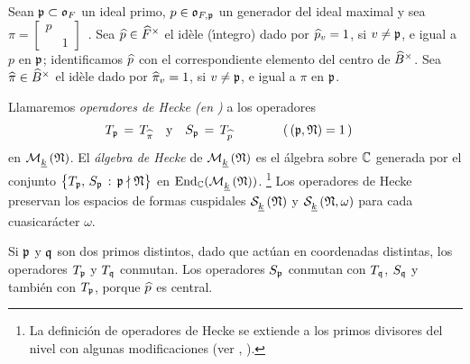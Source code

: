 Sean $\frak{p}\subset\oka{F}$ un ideal primo, $p\in\oka{F,\frak{p}}$ un
generador del ideal maximal y sea
\begin{math}
	\pi=\begin{bmatrix} p & \\ & 1 \end{bmatrix}
\end{math}~.
Sea $\hhat{p}\in\Idfin{F}$ el id\`{e}le (\'{\i}ntegro) dado por
$\hhat{p}_{v}=1$, si $v\not=\frak{p}$, e igual a $p$ en $\frak{p}$;
identificamos $\hhat{p}$ con el correspondiente elemento del centro de
$\Idfin{B}$. Sea $\hhat{\pi}\in\Idfin{B}$ el id\`{e}le dado por
$\hhat{\pi}_{v}=1$, si $v\not=\frak{p}$, e igual a $\pi$ en $\frak{p}$.

\begin{defOperadoresDeHeckeMatrices}\label{def:operadoresdeheckematrices}
	Llamaremos \emph{operadores de Hecke (en )} a los operadores
	\begin{align*}
		T_{\frak{p}}\,=\,T_{\hhat{\pi}} & \quad\text{y}\quad
			S_{\frak{p}}\,=\,T_{\hhat{p}}
		\qquad\qquad (\,(\frak{p},\frak{N})=1\,)
	\end{align*}
	en $\modularH{k}{\frak{N}}$.
	El \emph{\'{a}lgebra de Hecke} de $\modularH{k}{\frak{N}}$ es el
	\'{a}lgebra sobre $\bb{C}$ generada por el conjunto
	\begin{math}
		\big\{T_{\frak{p}},\,S_{\frak{p}}
			\,:\,\frak{p}\nmid\frak{N}\big\}
	\end{math}
	en $\Endo[\bb{C}](\modularH{k}{\frak{N}})$.%
	\footnote{
		La definici\'{o}n de operadores de Hecke se extiende a los
		primos divisores del nivel con algunas modificaciones (ver
		\cite{ShemanskeWalling}, \cite{MiyakeOnAutomorphicFormsOnGL}).
	}
	Los operadores de Hecke preservan los espacios de formas cuspidales
	$\spitzH{k}{\frak{N}}$ y $\spitzH{k}{\frak{N},\omega}$ para cada
	cuasicar\'{a}cter $\omega$.
\end{defOperadoresDeHeckeMatrices}

Si $\frak{p}$ y $\frak{q}$ son dos primos distintos, dado que act\'{u}an
en coordenadas distintas, los operadores $T_{\frak{p}}$ y $T_{\frak{q}}$
conmutan. Los operadores $S_{\frak{p}}$ conmutan con $T_{\frak{q}}$,
$S_{\frak{q}}$ y tambi\'{e}n con $T_{\frak{p}}$, porque $\hhat{p}$ es central.

